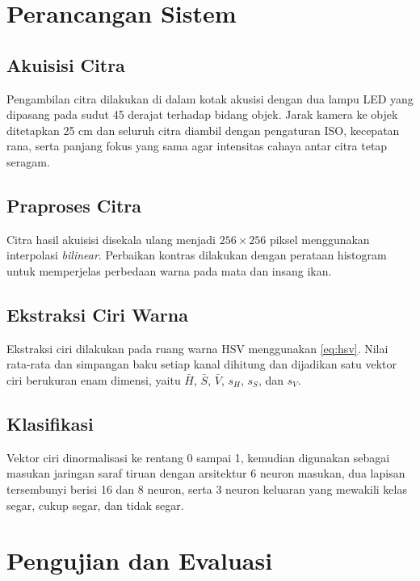 \section{Perancangan Sistem}

\subsection{Akuisisi Citra}

Pengambilan citra dilakukan di dalam kotak akusisi dengan dua lampu LED
yang dipasang pada sudut 45 derajat terhadap bidang objek. Jarak kamera
ke objek ditetapkan 25 cm dan seluruh citra diambil dengan pengaturan
ISO, kecepatan rana, serta panjang fokus yang sama agar intensitas
cahaya antar citra tetap seragam.

\subsection{Praproses Citra}

Citra hasil akuisisi disekala ulang menjadi $256 \times 256$ piksel
menggunakan interpolasi \textit{bilinear}. Perbaikan kontras dilakukan
dengan perataan histogram untuk memperjelas perbedaan warna pada mata
dan insang ikan.

\subsection{Ekstraksi Ciri Warna}

Ekstraksi ciri dilakukan pada ruang warna HSV menggunakan
\cref{eq:hsv}. Nilai rata-rata dan simpangan baku setiap kanal
dihitung dan dijadikan satu vektor ciri berukuran enam dimensi, yaitu
$\bar{H}$, $\bar{S}$, $\bar{V}$, $s_H$, $s_S$, dan $s_V$.

\subsection{Klasifikasi}

Vektor ciri dinormalisasi ke rentang 0 sampai 1, kemudian digunakan
sebagai masukan jaringan saraf tiruan dengan arsitektur 6 neuron
masukan, dua lapisan tersembunyi berisi 16 dan 8 neuron, serta 3 neuron
keluaran yang mewakili kelas segar, cukup segar, dan tidak segar.

\section{Pengujian dan Evaluasi}


